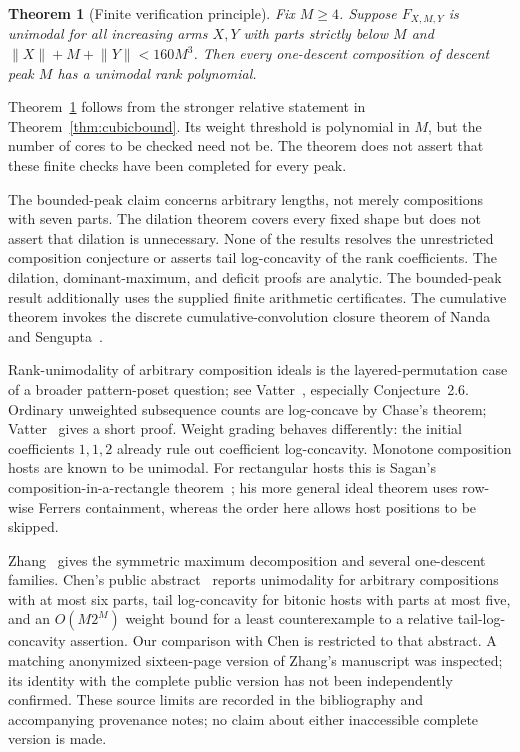 \documentclass[11pt]{article}
\newtheorem{theorem}{Theorem}[section]
\theoremstyle{remark}\newtheorem{remark}[theorem]{Remark}
\newcommand{\wt}[1]{\lVert #1\rVert}
\begin{document}
\begin{theorem}[Finite verification principle]\label{thm:finiteprinciple}
Fix $M\ge4$. Suppose $F_{X,M,Y}$ is unimodal for all increasing arms $X,Y$ with parts strictly below $M$ and $\wt X+M+\wt Y<160M^3$. Then every one-descent composition of descent peak $M$ has a unimodal rank polynomial.
\end{theorem}

Theorem~\ref{thm:finiteprinciple} follows from the stronger relative statement in Theorem~\ref{thm:cubicbound}. Its weight threshold is polynomial in $M$, but the number of cores to be checked need not be. The theorem does not assert that these finite checks have been completed for every peak.

The bounded-peak claim concerns arbitrary lengths, not merely compositions with seven parts. The dilation theorem covers every fixed shape but does not assert that dilation is unnecessary. None of the results resolves the unrestricted composition conjecture or asserts tail log-concavity of the rank coefficients. The dilation, dominant-maximum, and deficit proofs are analytic. The bounded-peak result additionally uses the supplied finite arithmetic certificates. The cumulative theorem invokes the discrete cumulative-convolution closure theorem of Nanda and Sengupta~\cite{NandaSengupta}.

Rank-unimodality of arbitrary composition ideals is the layered-permutation case of a broader pattern-poset question; see Vatter~\cite{Vatter}, especially Conjecture~2.6. Ordinary unweighted subsequence counts are log-concave by Chase's theorem; Vatter~\cite{VatterWords} gives a short proof. Weight grading behaves differently: the initial coefficients $1,1,2$ already rule out coefficient log-concavity. Monotone composition hosts are known to be unimodal. For rectangular hosts this is Sagan's composition-in-a-rectangle theorem~\cite{Sagan}; his more general ideal theorem uses row-wise Ferrers containment, whereas the order here allows host positions to be skipped.

Zhang~\cite{Zhang} gives the symmetric maximum decomposition and several one-descent families. Chen's public abstract~\cite{Chen} reports unimodality for arbitrary compositions with at most six parts, tail log-concavity for bitonic hosts with parts at most five, and an $O(M2^M)$ weight bound for a least counterexample to a relative tail-log-concavity assertion. Our comparison with Chen is restricted to that abstract. A matching anonymized sixteen-page version of Zhang's manuscript was inspected; its identity with the complete public version has not been independently confirmed. These source limits are recorded in the bibliography and accompanying provenance notes; no claim about either inaccessible complete version is made.
\end{document}
